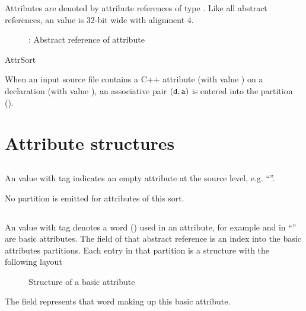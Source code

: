 \label{sec:ifc-attrs}


Attributes are denoted by attribute references of type . 
Like all abstract references, an  value is 32-bit wide with alignment $4$.
\begin{figure}[htbp]
  \centering
  \caption{: Abstract reference of attribute}
  \label{fig:ifc-attr-index}
\end{figure}

\begin{SortEnum}{AttrSort}
\end{SortEnum}

When an input source file contains a C++ attribute (with  value )
on a declaration (with  value ), an associative pair $(\mathtt{d}, \mathtt{a})$
is entered into the  partition 
().

\section{Attribute structures}
\label{sec:ifc:AttrSort-structures}

\subsection{}
\label{sec:ifc:AttrSort:Nothing}

An  value with tag  indicates an empty attribute
at the source level, e.g. ``\code{[[]]}''.

No partition is emitted for attributes of this sort.

\subsection{}
\label{sec:ifc:AttrSort:Basic}

An  value with tag  denotes a word () used in an attribute,
for example  and  in ``\code{[[answer(42)]]}'' are basic attributes.
The  field of that abstract reference is an index into the basic attributes partitions.
Each entry in that partition is a structure with the following layout
%
\begin{figure}[H]
    \centering
    \caption{Structure of a basic attribute}
    \label{fig:ifc:AttrSort:Basic}
\end{figure}
%
The  field represents that word making up this basic attribute.

